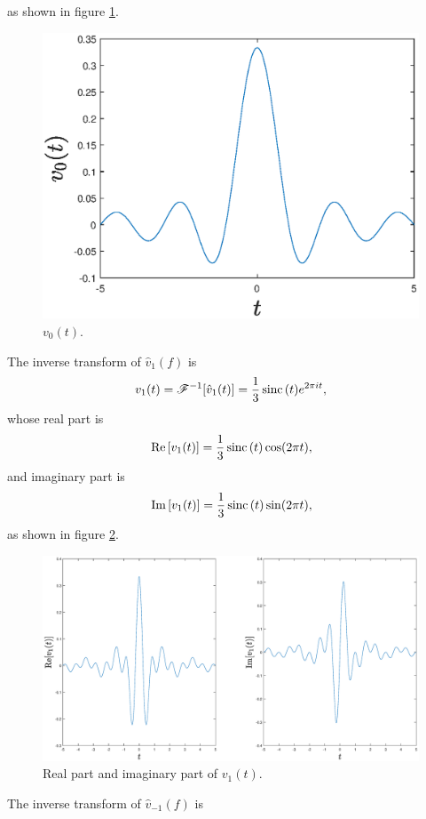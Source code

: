 \documentclass{assignment}
\begin{document}
\begin{sol}
\begin{itemize}
        as shown in figure \ref{A-8-P-6-v0(t)}.
        \begin{figure}[H]
            \centering
            \includegraphics[width=.4\columnwidth]{A-8-P-6-v0(t).eps}
            \caption{$v_0(t)$.}
            \label{A-8-P-6-v0(t)}
        \end{figure}
        The inverse transform of $\hat{v}_1(f)$ is
        \begin{align}
            v_1(t)=\mathscr{F}^{-1}[\hat{v}_1(t)]=\frac{1}{3}\,\text{sinc}\,(t)e^{2\pi it},
        \end{align}
        whose real part is
        \begin{align}
            \,\text{Re}\,[v_1(t)]=\frac{1}{3}\,\text{sinc}\,(t)\cos(2\pi t),
        \end{align}
        and imaginary part is
        \begin{align}
            \,\text{Im}\,[v_1(t)]=\frac{1}{3}\,\text{sinc}\,(t)\sin(2\pi t),
        \end{align}
        as shown in figure \ref{A-8-P-6-v1(t)}.
        \begin{figure}[H]
            \centering
            \includegraphics[width=.99\columnwidth]{A-8-P-6-v1(t).eps}
            \caption{Real part and imaginary part of $v_1(t)$.}
            \label{A-8-P-6-v1(t)}
        \end{figure}
        The inverse transform of $\hat{v}_{-1}(f)$ is
        \begin{align}

\end{align}
\end{itemize}
\end{sol}
\end{document}
